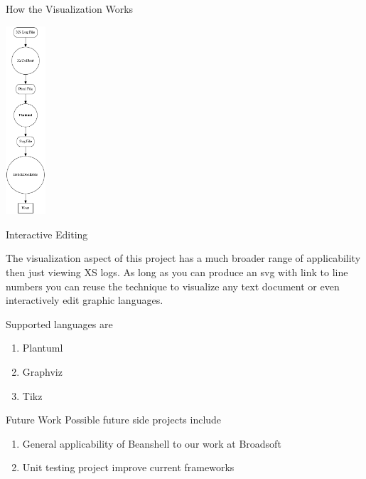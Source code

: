 \documentclass{beamer}
\begin{document}
\begin{frame}[fragile]{How the Visualization Works}
\begin{center}
\includegraphics[height=7cm]{dattflow.png}
\end{center}
\end{frame}

\begin{frame}{Interactive Editing}

The visualization aspect of this project has a much broader range of applicability then just viewing XS logs. As long as you can produce an
svg with link to line numbers you can reuse the technique to visualize any
text document or even interactively edit graphic languages.

Supported languages are

\begin{enumerate}
\item Plantuml\cite{Plantuml}
\item Graphviz\cite{Graphviz}
\item Tikz\cite{Tikz} 
\end{enumerate}

\end{frame}



\begin{frame}{Future Work}
Possible future side projects include
\begin{enumerate}
\item General applicability of Beanshell to our work at Broadsoft
\item Unit testing project improve current frameworks
\end{enumerate}
\end{frame}
\end{document}
